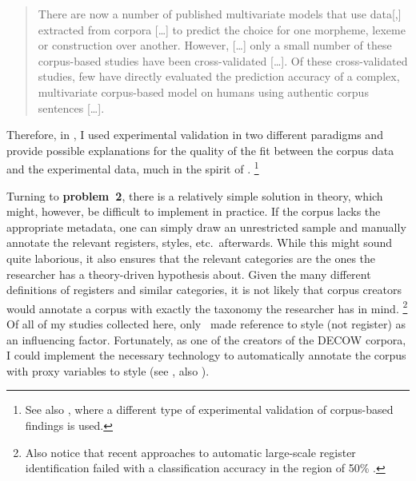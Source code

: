 \begin{quote}
  There are now a number of published multivariate models that use data[,] extracted from corpora [\ldots] to predict the choice for one morpheme, lexeme or construction over another.
  However, [\ldots] only a small number of these corpus-based studies have been cross-validated [\ldots].
  Of these cross-validated studies, few have directly evaluated the prediction accuracy of a complex, multivariate corpus-based model on humans using authentic corpus sentences [\ldots].
\end{quote}

Therefore, in \ROMeasure, I used experimental validation in two different paradigms and provide possible explanations for the quality of the fit between the corpus data and the experimental data, much in the spirit of \citet{Dabrowska2014}.%
\footnote{See also \citet{SchaeferPankratz2018}, where a different type of experimental validation of corpus-based findings is used.}

Turning to \textbf{problem~2}, there is a relatively simple solution in theory, which might, however, be difficult to implement in practice.
If the corpus lacks the appropriate metadata, one can simply draw an unrestricted sample and manually annotate the relevant registers, styles, etc.\ afterwards.
While this might sound quite laborious, it also ensures that the relevant categories are the ones the researcher has a theory-driven hypothesis about.
Given the many different definitions of registers and similar categories, it is not likely that corpus creators would annotate a corpus with exactly the taxonomy the researcher has in mind.%
\footnote{Also notice that recent approaches to automatic large-scale register identification failed with a classification accuracy in the region of 50\% \citep{BiberEgbert2016}.}
Of all of my studies collected here, only \ROMeasure\ made reference to style (not register) as an influencing factor.
Fortunately, as one of the creators of the DECOW corpora, I could implement the necessary technology to automatically annotate the corpus with proxy variables to style (see \RAMeasure, also \citealt{SchaeferEa2013}).

